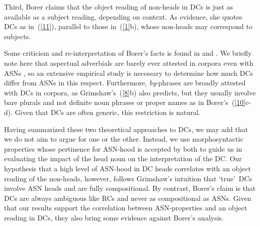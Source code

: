 \documentclass[output=paper]{langsci/langscibook}
\begin{document}
\begin{exe}
\end{exe}

Third, Borer claims that the object reading of non-heads in DCs is just as available as a subject reading, depending on context.
As evidence, she quotes DCs  as in~(\ref{11}), parallel to those in~(\ref{1}b), whose non-heads may correspond to subjects. 

\begin{exe}
\end{exe}

Some criticism and re-interpretation of Borer's facts is found in \cite{iordachioaia:alexiadou:pairamidis:17} and \cite{iordachioaia:toappear}.
We briefly note here that aspectual adverbials are barely ever attested in corpora even with ASNs \citep[39--42]{lieber:16}, so an extensive empirical study is necessary to determine how much DCs differ from ASNs in this respect.
Furthermore, \textit{by}-phrases are broadly attested with DCs in corpora, as Grimshaw's~(\ref{8}b) also predicts, but they usually involve bare plurals and not definite noun phrases or proper names as in Borer's~(\ref{10}c-d).
Given that DCs are often generic, this restriction is natural.

Having summarized these two  theoretical approaches to DCs, we may add that we do not aim to argue for one or the other. Instead, we use morphosyntactic properties whose pertinence for ASN-hood is accepted by both to guide us in evaluating the impact of the head noun on the interpretation of the DC. Our hypothesis that a high level of ASN-hood in DC heads correlates with an object reading of the non-heads, however, follows Grimshaw's intuition that \lq true\rq\  DCs involve ASN heads and are fully compositional. By contrast, Borer's claim is that DCs are always ambiguous like RCs and never as compositional as ASNs.
 {Given that our results support the correlation between ASN-properties and an object reading in DCs, they also bring some evidence against Borer's analysis.}
\end{document}
